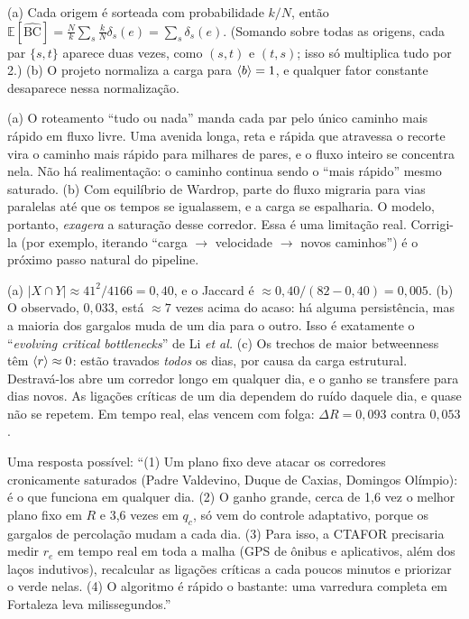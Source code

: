 \documentclass[11pt]{article}
\begin{document}
(a) Cada origem é sorteada com probabilidade $k/N$, então $\mathbb E[\widehat{\mathrm{BC}}] = \frac Nk\sum_s\frac kN\delta_s(e) = \sum_s\delta_s(e)$. (Somando sobre todas as origens, cada par $\{s,t\}$ aparece duas vezes, como $(s,t)$ e $(t,s)$; isso só multiplica tudo por 2.) (b) O projeto normaliza a carga para $\left\langle b \right\rangle = 1$, e qualquer fator constante desaparece nessa normalização.

(a) O roteamento ``tudo ou nada'' manda cada par pelo único caminho mais rápido em fluxo livre. Uma avenida longa, reta e rápida que atravessa o recorte vira o caminho mais rápido para milhares de pares, e o fluxo inteiro se concentra nela. Não há realimentação: o caminho continua sendo o ``mais rápido'' mesmo saturado. (b) Com equilíbrio de Wardrop, parte do fluxo migraria para vias paralelas até que os tempos se igualassem, e a carga se espalharia. O modelo, portanto, \emph{exagera} a saturação desse corredor. Essa é uma limitação real. Corrigi-la (por exemplo, iterando ``carga $\to$ velocidade $\to$ novos caminhos'') é o próximo passo natural do pipeline.

(a) $|X\cap Y|\approx41^2/4166 = 0{,}40$, e o Jaccard é $\approx0{,}40/(82-0{,}40) = 0{,}005$. (b) O observado, $0{,}033$, está $\approx7$ vezes acima do acaso: há alguma persistência, mas a maioria dos gargalos muda de um dia para o outro. Isso é exatamente o ``\emph{evolving critical bottlenecks}'' de Li \emph{et al.} (c) Os trechos de maior betweenness têm $\left\langle r \right\rangle\approx0$: estão travados \emph{todos} os dias, por causa da carga estrutural. Destravá-los abre um corredor longo em qualquer dia, e o ganho se transfere para dias novos. As ligações críticas de um dia dependem do ruído daquele dia, e quase não se repetem. Em tempo real, elas vencem com folga: $\Delta R = 0{,}093$ contra $0{,}053$.

Uma resposta possível: ``(1) Um plano fixo deve atacar os corredores cronicamente saturados (Padre Valdevino, Duque de Caxias, Domingos Olímpio): é o que funciona em qualquer dia. (2) O ganho grande, cerca de 1,6 vez o melhor plano fixo em $R$ e 3,6 vezes em $q_c$, só vem do controle adaptativo, porque os gargalos de percolação mudam a cada dia. (3) Para isso, a CTAFOR precisaria medir $r_e$ em tempo real em toda a malha (GPS de ônibus e aplicativos, além dos laços indutivos), recalcular as ligações críticas a cada poucos minutos e priorizar o verde nelas. (4) O algoritmo é rápido o bastante: uma varredura completa em Fortaleza leva milissegundos.''
\end{document}
